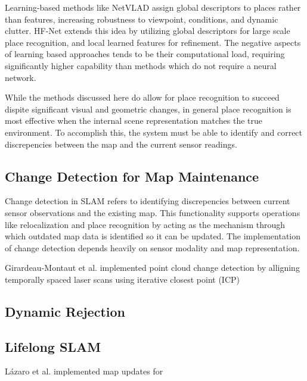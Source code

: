 Learning-based methods like NetVLAD \cite{arandjelovicNetVLADCNNArchitecture2016} assign global descriptors to places rather than features, increasing robustness to viewpoint, conditions, and dynamic clutter. HF-Net \cite{sarlinCoarseFineRobust2019} extends this idea by utilizing global descriptors for large scale place recognition, and local learned features for refinement. The negative aspects of learning based approaches tends to be their computational load, requiring significantly higher capability than methods which do not require a neural network.

While the methods discussed here do allow for place recognition to succeed dispite significant visual and geometric changes, in general place recognition is most effective when the internal scene representation matches the true environment. To accomplish this, the system must be able to identify and correct discrepencies between the map and the current sensor readings.

\subsection{Change Detection for Map Maintenance}

Change detection in SLAM refers to identifying discrepencies between current sensor observations and the existing map. This functionality supports operations like relocalization and place recognition by acting as the mechanism through which outdated map data is identified so it can be updated. The implementation of change detection depends heavily on sensor modality and map representation.

Girardeau-Montaut et al. \cite{girardeau-montautCHANGEDETECTIONPOINTS2005} implemented point cloud change detection by alligning temporally spaced laser scans using iterative closest point (ICP) \cite{arunLeastSquaresFittingTwo1987}
\cite{beslMethodRegistration3D1992}

\subsection{Dynamic Rejection}

\subsection{Lifelong SLAM}
Lázaro et al. implemented map updates for